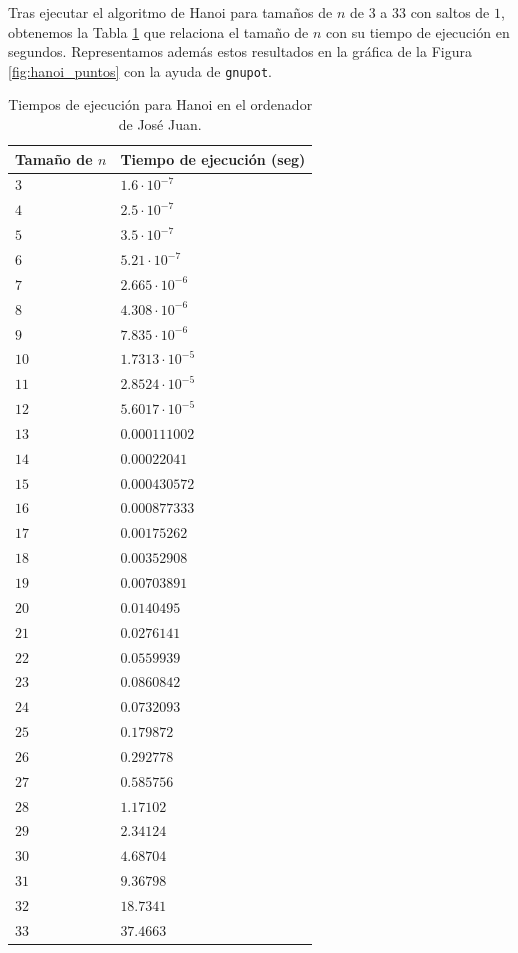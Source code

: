 \documentclass[12pt]{article}
\begin{document}
    Tras ejecutar el algoritmo de Hanoi para tamaños de $n$ de $3$ a $33$ con saltos de $1$, obtenemos la Tabla \ref{tab:hanoi_tiempos} que relaciona el tamaño de $n$ con su tiempo de ejecución en segundos. Representamos además estos resultados en la gráfica de la Figura \ref{fig:hanoi_puntos} con la ayuda de \verb|gnupot|.
    \begin{table}
        \centering
        \begin{tabular}{|l|l|}
            \hline
            Tamaño de $n$ & Tiempo de ejecución (seg) \\
            \hline
            $3$ & $1.6\cdot 10^{-7}$\\
            $4$ & $2.5\cdot 10^{-7}$\\
            $5$ & $3.5\cdot 10^{-7}$\\
            $6$ & $5.21\cdot 10^{-7}$\\
            $7$ & $2.665\cdot 10^{-6}$\\
            $8$ & $4.308\cdot 10^{-6}$\\
            $9$ & $7.835\cdot 10^{-6}$\\
            $10$ & $1.7313\cdot 10^{-5}$\\
            $11$ & $2.8524\cdot 10^{-5}$\\
            $12$ & $5.6017\cdot 10^{-5}$\\
            $13$ & $0.000111002$\\
            $14$ & $0.00022041$\\
            $15$ & $0.000430572$\\
            $16$ & $0.000877333$\\
            $17$ & $0.00175262$\\
            $18$ & $0.00352908$\\
            $19$ & $0.00703891$\\
            $20$ & $0.0140495$\\
            $21$ & $0.0276141$\\
            $22$ & $0.0559939$\\
            $23$ & $0.0860842$\\
            $24$ & $0.0732093$\\
            $25$ & $0.179872$\\
            $26$ & $0.292778$\\
            $27$ & $0.585756$\\
            $28$ & $1.17102$\\
            $29$ & $2.34124$\\
            $30$ & $4.68704$\\
            $31$ & $9.36798$\\
            $32$ & $18.7341$\\
            $33$ & $37.4663$\\
            \hline
        \end{tabular}
        \caption{Tiempos de ejecución para Hanoi en el ordenador de José Juan.}
        \label{tab:hanoi_tiempos}
    \end{table}
    
\end{document}
